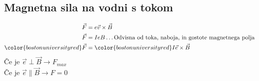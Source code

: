 {\color{indiagreen}\subsection{Magnetna sila na vodni s tokom}}
\begin{align*}
	\vec{F} &= e \vec{v} \times \vec{B}\\
	\vec{F} &= IeB \dots \text{Odvisna od toka, naboja, in gostote magnetnega polja}\\
	{\color{bostonuniversityred}\vec{F}} &= {\color{bostonuniversityred}I \vec{e} \times \vec{B}}\\
\end{align*}
Če je $\vec{e} \perp \vec{B} \rightarrow F_{max}$\\
Če je $\vec{e} \parallel \vec{B} \rightarrow F = 0$\\
